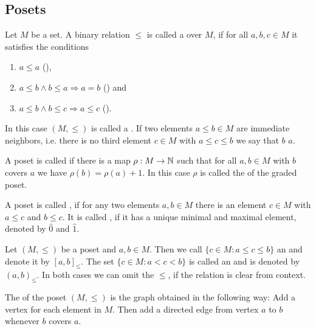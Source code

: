 \subsection{Posets}
\label{sec:posets}

\begin{defi}
	Let $M$ be a set. A binary relation $\leq$ is called a  over $M$, if for all $a,b,c \in M$ it satisfies the conditions
	\begin{enumerate}
		\item $a \leq a$ (),
		\item $a \leq b \wedge b \leq a \Rightarrow a=b$ () and
		\item $a \leq b \wedge b \leq c \Rightarrow a \leq c$ ().
	\end{enumerate}
	In this case $(M,\leq)$ is called a . If two elements $a \leq b \in M$ are immediate neighbors, i.e. there is no third element $c \in M$ with $a \leq c \leq b$ we say that $b$  $a$.
\end{defi}

\begin{defi}
	A poset is called  if there is a map $\rho : M \to \mathbb{N}$ such that for all $a,b \in M$ with $b$ covers $a$ we have $\rho(b) = \rho(a) + 1$. In this case $\rho$ is called the  of the graded poset.
\end{defi}

\begin{defi}
	A poset is called , if for any two elements $a,b \in M$ there is an element $c \in M$ with $a \leq c$ and $b \leq c$. It is called , if it has a unique minimal and maximal element, denoted by $\hat 0$ and $\hat 1$.
\end{defi}

\begin{defi}
	Let $(M,\leq)$ be a poset and $a,b \in M$. Then we call $\{ c \in M : a \leq c \leq b \}$ an  and denote it by $[a,b]_\leq$. The set $\{ c \in M : a < c < b \}$ is called an  and is denoted by $(a,b)_\leq$. In both cases we can omit the $\leq$, if the relation is clear from context.
\end{defi}

\begin{defi}
	The  of the poset $(M,\leq)$ is the graph obtained in the following way: Add a vertex for each element in $M$. Then add a directed edge from vertex $a$ to $b$ whenever $b$ covers $a$.
\end{defi}

